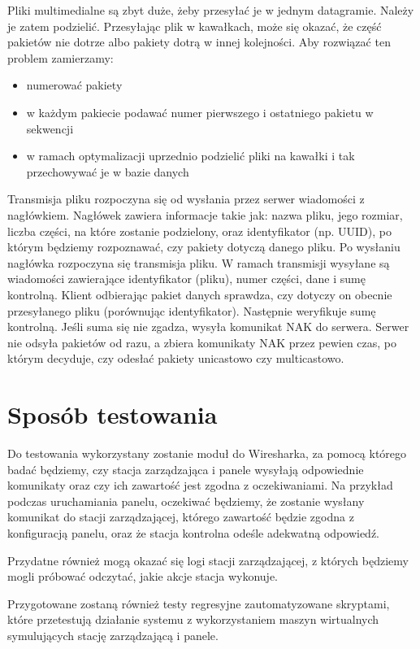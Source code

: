 \documentclass[12pt, a4paper]{article}
\providecommand{\tightlist}{%
  \setlength{\itemsep}{0pt}\setlength{\parskip}{0pt}}
\begin{document}
Pliki multimedialne są zbyt duże, żeby przesyłać je w jednym datagramie.
Należy je zatem podzielić. Przesyłając plik w kawałkach, może się
okazać, że część pakietów nie dotrze albo pakiety dotrą w innej
kolejności. Aby rozwiązać ten problem zamierzamy:

\begin{itemize}
\tightlist
\item
  numerować pakiety
\item
  w każdym pakiecie podawać numer pierwszego i ostatniego pakietu w
  sekwencji
\item
  w ramach optymalizacji uprzednio podzielić pliki na kawałki i tak
  przechowywać je w bazie danych
\end{itemize}

Transmisja pliku rozpoczyna się od wysłania przez serwer wiadomości z nagłówkiem.
Nagłówek zawiera informacje takie jak: nazwa pliku, jego rozmiar, liczba części, na
które zostanie podzielony, oraz identyfikator (np. UUID), po którym będziemy rozpoznawać, czy
pakiety dotyczą danego pliku. Po wysłaniu nagłówka rozpoczyna się transmisja pliku. W ramach transmisji wysyłane
są wiadomości zawierające identyfikator (pliku), numer części, dane i sumę kontrolną. Klient odbierając pakiet danych sprawdza, czy dotyczy on obecnie przesyłanego pliku (porównując identyfikator). Następnie weryfikuje sumę kontrolną. Jeśli suma się nie zgadza, wysyła komunikat NAK do serwera.
Serwer nie odsyła pakietów od razu, a zbiera komunikaty NAK przez pewien czas, po którym decyduje, czy odesłać pakiety unicastowo czy multicastowo.

\hypertarget{sposuxf3b-testowania}{%
\section{Sposób testowania}\label{sposuxf3b-testowania}}

Do testowania wykorzystany zostanie moduł do Wiresharka, za pomocą
którego badać będziemy, czy stacja zarządzająca i panele wysyłają
odpowiednie komunikaty oraz czy ich zawartość jest zgodna z
oczekiwaniami. Na przykład podczas uruchamiania panelu, oczekiwać
będziemy, że zostanie wysłany komunikat do stacji zarządzającej, którego
zawartość będzie zgodna z konfiguracją panelu, oraz że stacja kontrolna
odeśle adekwatną odpowiedź.

Przydatne również mogą okazać się logi stacji zarządzającej, z których
będziemy mogli próbować odczytać, jakie akcje stacja wykonuje.

Przygotowane zostaną również testy regresyjne zautomatyzowane skryptami, które przetestują działanie systemu z wykorzystaniem maszyn wirtualnych symulujących stację zarządzającą i panele.
\end{document}
